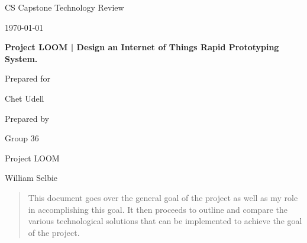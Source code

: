 \documentclass[onecolumn, draftclsnofoot,10pt, compsoc]{IEEEtran}
\def \CapstoneTeamName{		Project LOOM}
\def \CapstoneTeamNumber{		36}
\def \GroupMemberOne{			William Selbie}
\def \GroupMemberTwo{			Trevor Swope}
\def \GroupMemberThree{			Luke Goertzen}
\def \CapstoneProjectName{		Project LOOM | Design an Internet of Things Rapid Prototyping System.}
\def \CapstoneSponsorCompany{	}
\def \CapstoneSponsorPerson{		Chet Udell}
\def \DocType{	%
				Technology Review
				}
\newcommand{\NameSigPair}[1]{\par
\makebox[2.75in][r]{#1} \hfil 	\makebox[3.25in]{\makebox[2.25in]{\hrulefill} \hfill		\makebox[.75in]{\hrulefill}}
\par\vspace{-12pt} \textit{\tiny\noindent
\makebox[2.75in]{} \hfil		\makebox[3.25in]{\makebox[2.25in][r]{Signature} \hfill	\makebox[.75in][r]{Date}}}}
\renewcommand{\NameSigPair}[1]{#1}
\begin{document}
\begin{titlepage}
    \begin{singlespace}
        \hfill 
        \par\vspace{.2in}
        \centering
        \scshape{
            \huge CS Capstone \DocType \par
            {\large\today}\par
            \vspace{.5in}
            \textbf{\Huge\CapstoneProjectName}\par
            \vfill
            {\large Prepared for}\par
            \Huge \CapstoneSponsorCompany\par
            \vspace{5pt}
            {\Large\NameSigPair{\CapstoneSponsorPerson}\par}
            {\large Prepared by }\par
            Group\CapstoneTeamNumber\par
            \CapstoneTeamName\par 
            \vspace{5pt}
            {\Large
                \NameSigPair{\GroupMemberOne}\par
            }
            \vspace{20pt}
        }
       \begin{abstract} 
		This document goes over the general goal of the project as well as my role in accomplishing this goal.
		It then proceeds to outline and compare the various technological solutions that can be implemented to 
		achieve the goal of the project.
       \end{abstract}     
    \end{singlespace}
\end{titlepage}
\newpage
{}
\tableofcontents
\clearpage

\end{document}

